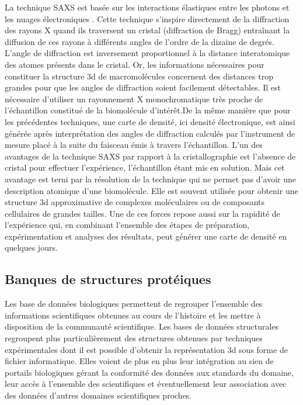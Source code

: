 La technique SAXS est basée sur les interactions élastiques entre les photons et les nuages électroniques \cite{guimer1955small}. Cette technique s'inspire directement de la diffraction des rayons X quand ils traversent un cristal (diffraction de Bragg) entraînant la diffusion de ces rayons à différents angles de l'ordre de la dizaine de degrés. L'angle de diffraction est inversement proportionnel à la distance interatomique des atomes présents dans le cristal. Or, les informations nécessaires pour constituer la structure 3d de macromolécules concernent des distances trop grandes pour que les angles de diffraction soient facilement détectables. Il est nécessaire d'utiliser un rayonnement X monochromatique très proche de l'échantillon constitué de la biomolécule d'intérêt.De la même manière que pour les précédentes techniques, une carte de densité, ici densité électronique, est ainsi générée après interprétation des angles de diffraction calculés par l'instrument de mesure placé à la suite du faisceau émis à travers l'échantillon.
L'un des avantages de la technique SAXS par rapport à la cristallographie est l'absence de cristal pour effectuer l'expérience, l'échantillon étant mis en solution. Mais cet avantage est terni par la résolution de la technique qui ne permet pas d'avoir une description atomique d'une biomolécule. Elle est souvent utilisée pour obtenir une structure 3d approximative de complexes moléculaires ou de composants cellulaires de grandes tailles. Une de ces forces repose aussi sur la rapidité de l'expérience qui, en combinant l'ensemble des étapes de préparation, expérimentation et analyses des résultats, peut générer une carte de densité en quelques jours.

\subsection{Banques de structures protéiques}

Les base de données biologiques permettent de regrouper l'ensemble des informations scientifiques obtenues au cours de l'histoire et les mettre à disposition de la communauté scientifique. Les bases de données structurales regroupent plus particulièrement des structures obtenues par techniques expérimentales dont il est possible d'obtenir la représentation 3d sous forme de fichier informatique. 
Elles voient de plus en plus leur intégration au sien de portails biologiques gérant la conformité des données aux standards du domaine, leur accès à l'ensemble des scientifiques et éventuellement leur association avec des données d'autres domaines scientifiques proches.

